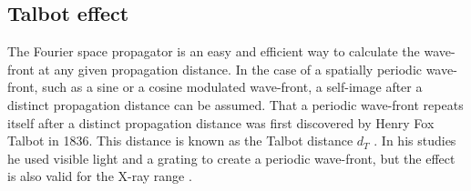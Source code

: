 \subsection{Talbot effect}\label{subsec:te}
The Fourier space propagator is an easy and efficient way to calculate the wave-front at any given propagation distance. In the case of a spatially periodic wave-front, such as a sine or a cosine modulated wave-front, a self-image after a distinct propagation distance can be assumed. That a periodic wave-front repeats itself after a distinct propagation distance was first discovered by Henry Fox Talbot in 1836. This distance is known as the Talbot distance $d_{T}$ \citep{Talbot1836}. In his studies he used visible light and a grating to create a periodic wave-front, but the effect is also valid for the X-ray range \citep{David2002}.


